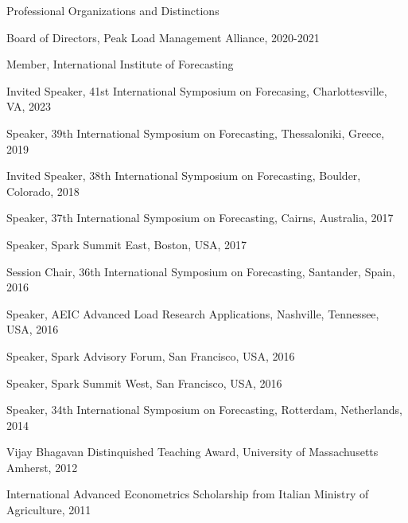 \documentclass{resume} %
\begin{document}
\begin{rSection}{Professional Organizations and Distinctions}

\item Board of Directors, Peak Load Management Alliance, 2020-2021
\item Member, International Institute of Forecasting
\item Invited Speaker, 41st International Symposium on Forecasing, Charlottesville, VA, 2023
\item Speaker, 39th International Symposium on Forecasting, Thessaloniki, Greece, 2019
\item Invited Speaker, 38th International Symposium on Forecasting, Boulder, Colorado, 2018
\item Speaker, 37th International Symposium on Forecasting, Cairns, Australia, 2017
\item Speaker, Spark Summit East, Boston, USA, 2017
\item Session Chair, 36th International Symposium on Forecasting, Santander, Spain, 2016
\item Speaker, AEIC Advanced Load Research Applications, Nashville, Tennessee, USA, 2016
\item Speaker, Spark Advisory Forum, San Francisco, USA, 2016
\item Speaker, Spark Summit West, San Francisco, USA, 2016
\item Speaker, 34th International Symposium on Forecasting, Rotterdam, Netherlands, 2014
\item Vijay Bhagavan Distinquished Teaching Award, University of Massachusetts Amherst, 2012
\item International Advanced Econometrics Scholarship from Italian Ministry of Agriculture, 2011

\end{rSection}
\end{document}
